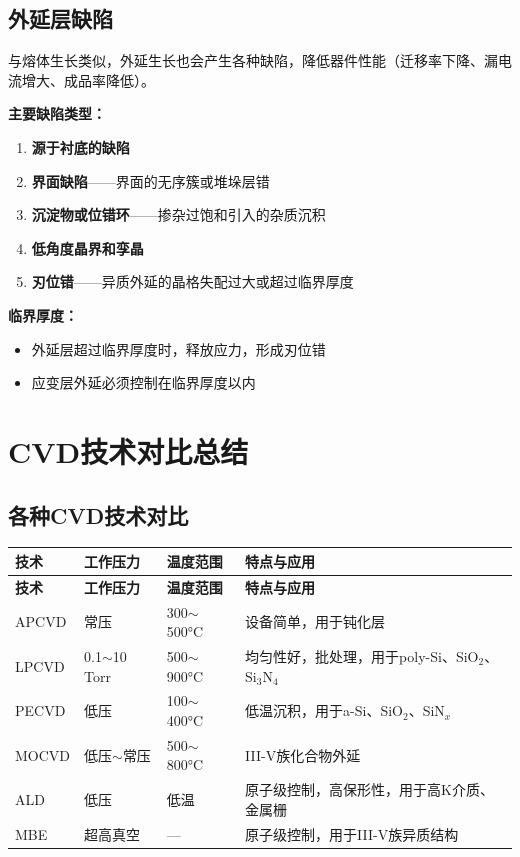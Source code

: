 \documentclass[UTF8,12pt,a4paper]{ctexart}
\begin{document}
\subsection{外延层缺陷}

与熔体生长类似，外延生长也会产生各种缺陷，降低器件性能（迁移率下降、漏电流增大、成品率降低）。

\textbf{主要缺陷类型：}

\begin{enumerate}
    \item \textbf{源于衬底的缺陷}
    \item \textbf{界面缺陷}——界面的无序簇或堆垛层错
    \item \textbf{沉淀物或位错环}——掺杂过饱和引入的杂质沉积
    \item \textbf{低角度晶界和孪晶}
    \item \textbf{刃位错}——异质外延的晶格失配过大或超过临界厚度
\end{enumerate}

\textbf{临界厚度：}
\begin{itemize}
    \item 外延层超过临界厚度时，释放应力，形成刃位错
    \item 应变层外延必须控制在临界厚度以内
\end{itemize}

\newpage

\section{CVD技术对比总结}

\subsection{各种CVD技术对比}

\begin{longtable}{|L{2cm}|L{2.5cm}|L{3cm}|L{7cm}|}
\hline
\textbf{技术} & \textbf{工作压力} & \textbf{温度范围} & \textbf{特点与应用} \\
\hline
\endfirsthead
\hline
\textbf{技术} & \textbf{工作压力} & \textbf{温度范围} & \textbf{特点与应用} \\
\hline
\endhead
\hline
\endfoot
\hline
\endlastfoot

APCVD & 常压 & 300$\sim$500°C & 设备简单，用于钝化层 \\
\hline

LPCVD & 0.1$\sim$10 Torr & 500$\sim$900°C & 均匀性好，批处理，用于poly-Si、SiO$_2$、Si$_3$N$_4$ \\
\hline

PECVD & 低压 & 100$\sim$400°C & 低温沉积，用于a-Si、SiO$_2$、SiN$_x$ \\
\hline

MOCVD & 低压$\sim$常压 & 500$\sim$800°C & III-V族化合物外延 \\
\hline

ALD & 低压 & 低温 & 原子级控制，高保形性，用于高K介质、金属栅 \\
\hline

MBE & 超高真空 & — & 原子级控制，用于III-V族异质结构 \\
\hline

\end{longtable}
\end{document}
